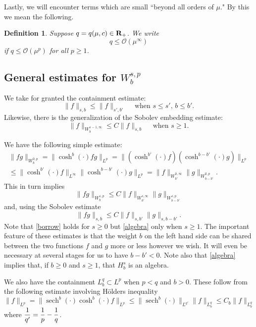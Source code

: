 \documentclass[12pt]{amsart}
\numberwithin{equation}{section}
\newtheorem{definition}[theorem]{Definition}
\newcommand{\ds}{\displaystyle}
\DeclareMathOperator{\sech}{sech}
\newcommand{\be}{\begin{equation}}
\newcommand{\ee}{\end{equation}}
\newcommand{\R}{{\bf{R}}}
\renewcommand{\O}{{\mathcal{O}}}
\begin{document}
Lastly, we will encounter terms which are small ``beyond all orders of $\mu$." By this we mean the following.
\begin{definition}\label{mu infinity} Suppose $q = q(\mu,c) \in \R_+$. We write 
$$
q \le \O(\mu^\infty)
$$
if $q \le\O(\mu^p)$ for all $p \ge 1$.
\end{definition}


\subsection{General estimates for $W^{s,p}_b$}
We take for granted the  containment estimate:  
$$
\| f\|_{s,b} \le \| f \|_{s',b'} \quad \text{ when $s \le s'$, $b \le b'$}.
$$
Likewise, there is the generalization of the Sobolev embedding estimate:
$$\ds
\| f\|_{W^{s-1,\infty}_b} \le C \| f\|_{s,b}\quad \text{ when $s \ge 1$}.
$$

We have the following simple estimate:
\begin{multline*}
\| f g \|_{W^{0,p}_b} = \| \cosh^b(\cdot) f g\|_{L^p} = \| (\cosh^{b'}(\cdot) f)( \cosh^{b-b'}(\cdot) g)\|_{L^p}\\
\le \| \cosh^{b'}(\cdot) f\|_{L^\infty} \| \cosh^{b-b'}(\cdot) g\|_{L^p} = \| f \|_{W^{0,\infty}_{b'}} \| g \|_{W^{0,p}_{b-b'}}.
\end{multline*}
This in turn implies 
\be\label{borrow}
\| f g\|_{W^{s,p}_b} \le C \| f\|_{W^{s,\infty}_{b'}}\| g\|_{W^{s,p}_{b-b'}}
\ee
and, using the Sobolev estimate
\be\label{algebra}
\| fg \|_{s,b} \le C \| f\|_{s,b'}\|g\|_{s,b-b'}.
\ee
Note that \eqref{borrow} holds for $s \ge 0$ but \eqref{algebra} only when $s \ge 1$.
The important feature of these estimates is that the weight $b$ on the left hand side can be shared
between the two functions $f$ and $g$ more or less however we wish. It will even be necessary at several stages for us to have $b-b'<0$.
Note also that \eqref{algebra} implies that, if $b \ge 0$ and $s\ge1$, that $H^s_b$ is an algebra.

We also have the containment $L^q_b \subset L^p$ when $p < q$ and $b > 0$. These follow
from the following estimate involving H\"olders inequality
\be\label{lp emb}
\| f\|_{L^p}=\| \sech^b(\cdot) \cosh^b(\cdot) f\|_{L^p} \le \|\sech^b(\cdot)\|_{L^{q'}} \| f \|_{L^{q}_b}\le C_b\| f \|_{L^{q}_b}
\ee
where $\ds {1 \over q'} = {1 \over p} - {1 \over q}$. 
\end{document}
